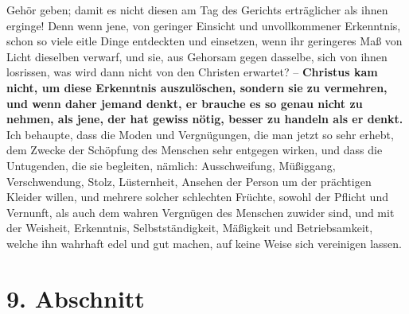 Gehör geben;
damit es nicht diesen am Tag des Gerichts erträglicher als ihnen erginge! Denn
wenn jene, von geringer Einsicht und unvollkommener Erkenntnis, schon so viele
eitle Dinge entdeckten und einsetzen, wenn ihr geringeres Maß von Licht
dieselben verwarf, und sie, aus Gehorsam gegen dasselbe, sich von ihnen
losrissen, was wird dann nicht von den Christen erwartet? --
\label{ref:14_08_wahre_nachfolger_rational}
\textbf{Christus kam nicht,
um diese Erkenntnis auszulöschen, sondern sie zu vermehren, und wenn daher
jemand denkt, er brauche es so genau nicht zu nehmen, als jene, der hat gewiss
nötig, besser zu handeln als er denkt.} Ich behaupte, dass die Moden und
Vergnügungen, die man jetzt so sehr erhebt, dem Zwecke der Schöpfung des
Menschen sehr entgegen wirken, und dass die Untugenden, die sie begleiten,
nämlich: Ausschweifung, Müßiggang, 
Verschwendung, Stolz, Lüsternheit, Ansehen
der Person um der prächtigen Kleider willen, und mehrere solcher schlechten
Früchte, sowohl der Pflicht und Vernunft, als auch dem wahren Vergnügen des
Menschen zuwider sind, und mit der Weisheit, Erkenntnis, Selbstständigkeit,
Mäßigkeit und Betriebsamkeit, welche ihn wahrhaft edel und gut machen, auf keine
Weise sich vereinigen lassen.

\section{9. Abschnitt} \label{kap14_ab9}

